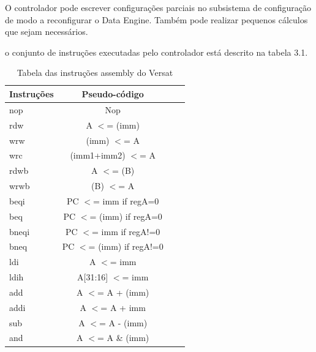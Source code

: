 O controlador pode escrever configurações parciais no subsistema de configuração de modo a reconfigurar o Data Engine. Também pode realizar pequenos cálculos que sejam necessários.

o conjunto de instruções executadas pelo controlador está descrito na tabela 3.1.

\pagebreak

\begin{table}[h!]
  \caption[Tabela das instruções assembly do Versat]{Tabela das instruções assembly do Versat}
  \begin{center}
    \begin{tabular}{|C{2cm}|c|c|c|}
      \hline
      {\bf Instruções} & {\bf Pseudo-código} \\
      \hline \hline
      nop & Nop \\
      \hline
      rdw & A $<$= (imm) \\
      \hline
      wrw & (imm) $<$= A \\
      \hline
      wrc & (imm1+imm2) $<$= A \\
      \hline
      rdwb & A $<$= (B) \\
      \hline 
      wrwb & (B) $<$= A \\
      \hline
      beqi & PC $<$= imm if regA=0\\
      \hline
      beq & PC $<$= (imm) if regA=0\\
      \hline
      bneqi & PC $<$= imm if regA!=0\\
      \hline
      bneq & PC $<$= (imm) if regA!=0\\
      \hline
      ldi & A $<$= imm \\
      \hline
      ldih & A[31:16] $<$= imm \\
      \hline
      add & A $<$= A + (imm) \\
      \hline
      addi & A $<$= A + imm\\
      \hline
      sub & A $<$= A - (imm)\\
      \hline 
      and & A $<$= A {\&} (imm) \\
     \hline
    \end{tabular}
  \end{center}
  \label{table:assembly_Versat}
\end{table}






